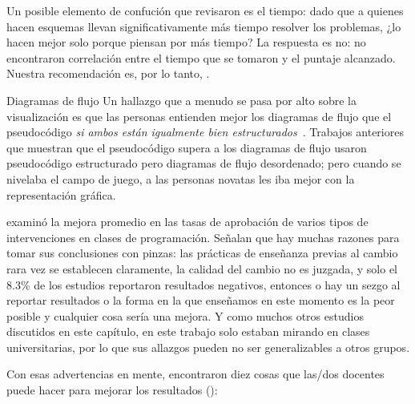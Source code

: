 Un posible elemento de confución que revisaron es el tiempo:
dado que a quienes hacen esquemas llevan significativamente más tiempo resolver los problemas,
¿lo hacen mejor solo porque piensan por más tiempo?
La respuesta es no:
no encontraron correlación entre el tiempo que se tomaron y el puntaje alcanzado.
Nuestra recomendación es, por lo tanto, .

\begin{aside}{Diagramas de flujo}
  Un hallazgo que a menudo se pasa por alto sobre la visualización es que 
  las personas entienden mejor los diagramas de flujo que el pseudocódigo \emph{si ambos están igualmente bien estructurados}~\cite{Scan1989}.
  Trabajos anteriores que muestran que el pseudocódigo supera a los diagramas de flujo usaron pseudocódigo estructurado pero diagramas de flujo desordenado;
  pero cuando se nivelaba el campo de juego,
  a las personas novatas les iba mejor con la representación gráfica.
\end{aside}


\cite{Viha2014} examinó la mejora promedio en las tasas de aprobación de varios tipos de intervenciones en clases de programación.
Señalan que hay muchas razones para tomar sus conclusiones con pinzas:
las prácticas de enseñanza previas al cambio rara vez se establecen claramente,
la calidad del cambio no es juzgada,
y solo el 8.3\% de los estudios reportaron resultados negativos,
entonces o hay un sezgo al reportar resultados
o la forma en la que enseñamos en este momento es la peor posible y cualquier cosa sería una mejora.
Y como muchos otros estudios discutidos en este capítulo,
en este trabajo solo estaban mirando en clases universitarias,
por lo que sus allazgos pueden no ser generalizables a otros grupos.

Con esas advertencias en mente,
encontraron diez cosas que las/dos docentes puede hacer para mejorar los resultados ():

